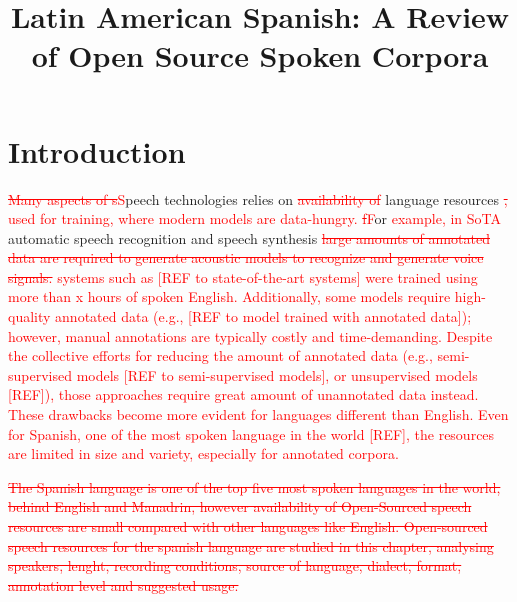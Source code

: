 \documentclass[10pt, a4paper]{article}
\title{Latin American Spanish: A Review of Open Source Spoken Corpora}
\newcommand{\macb}{\textcolor{red}}
\begin{document}
\maketitleabstract


\section{Introduction}

\macb{\st{Many aspects of s}S}peech technologies relies on \macb{\st{availability of}} language resources \macb{\st{,} used for training, where modern models are data-hungry.} \macb{\st{f}F}or \macb{example, in SoTA} automatic speech recognition and speech synthesis \macb{\st{large amounts of annotated data are required to generate acoustic models to recognize and generate voice signals.} systems such as [REF to state-of-the-art systems] were trained using more than x hours of spoken English. Additionally, some models require high-quality annotated data (e.g., [REF to model trained with annotated data]); however, manual annotations are typically costly and time-demanding. Despite the collective efforts for reducing the amount of annotated data (e.g., semi-supervised models [REF to semi-supervised models], or unsupervised models [REF]), those approaches require great amount of unannotated data instead. These drawbacks become more evident for languages different than English. Even for Spanish, one of the most spoken language in the world [REF], the resources are limited in size and variety, especially for annotated corpora.}


\macb{\st{The Spanish language is one of the top five most spoken languages in the world, behind English and Manadrin, however availability of Open-Sourced speech resources are small compared with other languages like English. Open-sourced speech resources for the spanish language are studied in this chapter, analysing speakers, lenght, recording conditions, source of language, dialect, format, annotation level and suggested usage.}}


\end{document}
